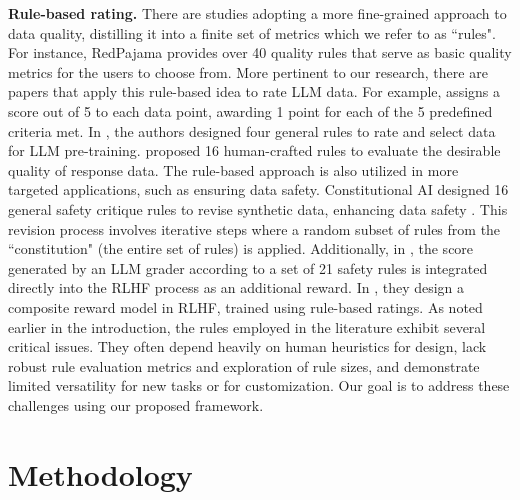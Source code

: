 \documentclass{article}
\begin{document}
\textbf{Rule-based rating.} There are studies adopting a more fine-grained approach to data quality, distilling it into a finite set of metrics which we refer to as ``rules". For instance, RedPajama \citep{RedPajama2023} provides over 40 quality rules that serve as basic quality metrics for the users to choose from. More pertinent to our research, there are papers that apply this rule-based idea to rate LLM data. For example, \citet{yuan2024self} assigns a score out of 5 to each data point, awarding 1 point for each of the 5 predefined criteria met. In \citet{wettig2024qurating}, the authors designed four general rules to rate and select data for LLM pre-training. \citep{sun2024principle} proposed 16 human-crafted rules to evaluate the desirable quality of response data. The rule-based approach is also utilized in more targeted applications, such as ensuring data safety. Constitutional AI designed 16 general safety critique rules to revise synthetic data, enhancing data safety \citep{bai2022constitutional}. This revision process involves iterative steps where a random subset of rules from the ``constitution" (the entire set of rules) is applied. Additionally, in \citet{murule}, the score generated by an LLM grader according to a set of 21 safety rules is integrated directly into the RLHF process as an additional reward. In \citet{wang2024helpsteer2}, they design a composite reward model in RLHF, trained using rule-based ratings. As noted earlier in the introduction, the rules employed in the literature exhibit several critical issues. They often depend heavily on human heuristics for design, lack robust rule evaluation metrics and exploration of rule sizes, and demonstrate limited versatility for new tasks or for customization. Our goal is to address these challenges using our proposed framework.




\section{Methodology}\label{sec:Methodology}
\end{document}
